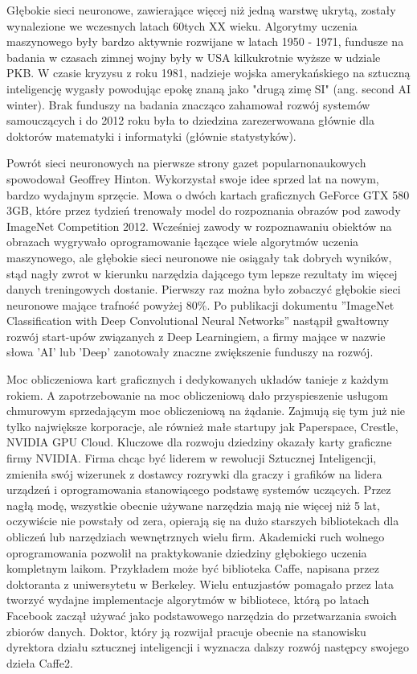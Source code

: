\documentclass[12pt,a4paper,twoside,titlepage,openright]{book}
\begin{document}
Głębokie sieci neuronowe, zawierające więcej niż jedną warstwę ukrytą, zostały wynalezione we wczesnych latach 60tych XX wieku. Algorytmy uczenia maszynowego były bardzo aktywnie rozwijane w latach 1950 - 1971, fundusze na badania w czasach zimnej wojny były w USA kilkukrotnie wyższe w udziale PKB. W czasie kryzysu z roku 1981, nadzieje wojska amerykańskiego na sztuczną inteligencję wygasły powodując epokę znaną jako "drugą zimę SI" (ang. second AI winter). Brak funduszy na badania znacząco zahamował rozwój systemów samouczących i do 2012 roku była to dziedzina zarezerwowana głównie dla doktorów matematyki i informatyki (głównie statystyków). \cite{siteAIhistory}

Powrót sieci neuronowych na pierwsze strony gazet popularnonaukowych spowodował Geoffrey Hinton. Wykorzystał swoje idee sprzed lat na nowym, bardzo wydajnym sprzęcie. Mowa o dwóch kartach graficznych GeForce GTX 580 3GB\cite{NIPS2012_4824}, które przez tydzień trenowały model do rozpoznania obrazów pod zawody ImageNet Competition 2012. Wcześniej zawody w rozpoznawaniu obiektów na obrazach wygrywało oprogramowanie łączące wiele algorytmów uczenia maszynowego, ale głębokie sieci neuronowe nie osiągały tak dobrych wyników, stąd nagły zwrot w kierunku narzędzia dającego tym lepsze rezultaty im więcej danych treningowych dostanie. Pierwszy raz można było zobaczyć głębokie sieci neuronowe mające trafność powyżej 80\%. Po publikacji dokumentu ''ImageNet Classification with Deep Convolutional Neural Networks'' nastąpił gwałtowny rozwój start-upów związanych z Deep Learningiem, a firmy mające w nazwie słowa 'AI' lub 'Deep' zanotowały znaczne zwiększenie funduszy na rozwój.

Moc obliczeniowa kart graficznych i dedykowanych układów tanieje z każdym rokiem. A zapotrzebowanie na moc obliczeniową dało przyspieszenie usługom chmurowym sprzedającym moc obliczeniową na żądanie. Zajmują się tym już nie tylko największe korporacje, ale również małe startupy jak Paperspace, Crestle, NVIDIA GPU Cloud. Kluczowe dla rozwoju dziedziny okazały karty graficzne firmy NVIDIA. Firma chcąc być liderem w rewolucji Sztucznej Inteligencji, zmieniła swój wizerunek z dostawcy rozrywki dla graczy i grafików na lidera urządzeń i oprogramowania stanowiącego podstawę systemów uczących. Przez nagłą modę, wszystkie obecnie używane narzędzia mają nie więcej niż 5 lat, oczywiście nie powstały od zera, opierają się na dużo starszych bibliotekach dla obliczeń lub narzędziach wewnętrznych wielu firm. Akademicki ruch wolnego oprogramowania pozwolił na praktykowanie dziedziny głębokiego uczenia kompletnym laikom. Przykładem może być biblioteka Caffe, napisana przez doktoranta z uniwersytetu w Berkeley. Wielu entuzjastów pomagało przez lata tworzyć wydajne implementacje algorytmów w bibliotece, którą po latach Facebook zaczął używać jako podstawowego narzędzia do przetwarzania swoich zbiorów danych. Doktor, który ją rozwijał pracuje obecnie na stanowisku dyrektora działu sztucznej inteligencji i wyznacza dalszy rozwój następcy swojego dzieła Caffe2. \cite{siteJia}
\end{document}
